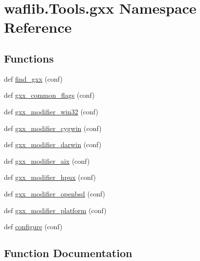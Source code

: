 \hypertarget{namespacewaflib_1_1_tools_1_1gxx}{}\section{waflib.\+Tools.\+gxx Namespace Reference}
\label{namespacewaflib_1_1_tools_1_1gxx}
\subsection*{Functions}
\begin{DoxyCompactItemize}
\item 
def \hyperlink{namespacewaflib_1_1_tools_1_1gxx_a429b712dd222e6e975da527c68c08ba8}{find\+\_\+gxx} (conf)
\item 
def \hyperlink{namespacewaflib_1_1_tools_1_1gxx_a86410b2f6bcf01791c43e27ddebf3080}{gxx\+\_\+common\+\_\+flags} (conf)
\item 
def \hyperlink{namespacewaflib_1_1_tools_1_1gxx_a5161aa30bcb691ffeb6b39da4b9b2b62}{gxx\+\_\+modifier\+\_\+win32} (conf)
\item 
def \hyperlink{namespacewaflib_1_1_tools_1_1gxx_a70609bea69338d82affec21284c6c5dc}{gxx\+\_\+modifier\+\_\+cygwin} (conf)
\item 
def \hyperlink{namespacewaflib_1_1_tools_1_1gxx_afb73b72b4db84fa412549484f754901e}{gxx\+\_\+modifier\+\_\+darwin} (conf)
\item 
def \hyperlink{namespacewaflib_1_1_tools_1_1gxx_aae0a6b0cc6273670e94d02a1601481ca}{gxx\+\_\+modifier\+\_\+aix} (conf)
\item 
def \hyperlink{namespacewaflib_1_1_tools_1_1gxx_a5862cdb93d3572914361f8f6261e8a18}{gxx\+\_\+modifier\+\_\+hpux} (conf)
\item 
def \hyperlink{namespacewaflib_1_1_tools_1_1gxx_a6915c3fe47d85e1eca7787adfc24e570}{gxx\+\_\+modifier\+\_\+openbsd} (conf)
\item 
def \hyperlink{namespacewaflib_1_1_tools_1_1gxx_a8ac4de3cf5a92e00e8c75e1272521afa}{gxx\+\_\+modifier\+\_\+platform} (conf)
\item 
def \hyperlink{namespacewaflib_1_1_tools_1_1gxx_aaf1ce44a59356fa376d25557d760bf6a}{configure} (conf)
\end{DoxyCompactItemize}


\subsection{Function Documentation}
